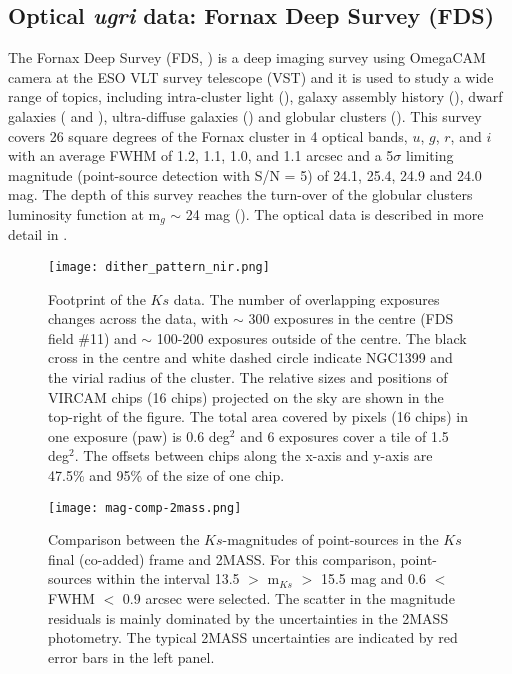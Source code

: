 \documentclass[fleqn,usenatbib]{mnras}
\begin{document}
\subsection{Optical \textit{ugri} data: Fornax Deep Survey (FDS)}
The Fornax Deep Survey (FDS, \citealp{fds}) is a deep imaging survey using OmegaCAM camera at the ESO VLT survey telescope (VST) and it is used to study a wide range of topics, including intra-cluster light (\citealp{Iodice-2016,Iodice-2017,spavone}), galaxy assembly history (\citealp{raj}), dwarf galaxies (\citealp{venhola2018} and \citealp{venhola-2019}), ultra-diffuse galaxies (\citealp{Venhola-2017}) and globular clusters (\citealp{Cantiello2020}). This survey covers 26 square degrees of the Fornax cluster in 4 optical bands, $u$, $g$, $r$, and $i$ with an average FWHM of 1.2, 1.1, 1.0, and 1.1 arcsec and a 5$\sigma$ limiting magnitude (point-source detection with S/N = 5) of 24.1, 25.4, 24.9 and 24.0 mag. The depth of this survey reaches the turn-over of the globular clusters luminosity function at m$_g$ $\sim$ 24 mag (\citealp{jordan2007}). The optical data is described in more detail in \citet{venhola2018}. 

\begin{figure}
\centering
        \texttt{[image: dither\_pattern\_nir.png]}
    \caption{Footprint of the $Ks$ data. The number of overlapping exposures changes across the data, with $\sim$ 300 exposures in the centre (FDS field \#11) and $\sim$ 100-200 exposures outside of the centre. The black cross in the centre and white dashed circle indicate NGC1399 and the virial radius of the cluster. The relative sizes and positions of VIRCAM chips (16 chips) projected on the sky are shown in the top-right of the figure. The total area covered by pixels (16 chips) in one exposure (paw) is 0.6 deg$^2$ and 6 exposures cover a tile of 1.5 deg$^2$. The offsets between chips along the x-axis and y-axis are 47.5\% and 95\% of the size of one chip.}
\label{footprint}
\end{figure}

\begin{figure*}
\centering
        \texttt{[image: mag-comp-2mass.png]}
\caption{Comparison between the $Ks$-magnitudes of point-sources in the $Ks$ final (co-added) frame and 2MASS. For this comparison, point-sources within the interval 13.5 $>$ m$_{Ks}$ $>$ 15.5 mag and 0.6 $<$ FWHM $<$ 0.9 arcsec were selected. The scatter in the magnitude residuals is mainly dominated by the uncertainties in the 2MASS photometry. The typical 2MASS uncertainties are indicated by red error bars in the left panel.}
\label{kmagcomparison}
\end{figure*}
\end{document}
